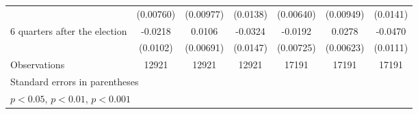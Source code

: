 \begin{table}[!ht]
\begin{tabular}{l*{6}{c}}
                    &   (0.00760)         &   (0.00977)         &    (0.0138)         &   (0.00640)         &   (0.00949)         &    (0.0141)         \\
[1em]
 6 quarters after the election&     -0.0218\sym{*}  &      0.0106         &     -0.0324\sym{*}  &     -0.0192\sym{**} &      0.0278\sym{***}&     -0.0470\sym{***}\\
                    &    (0.0102)         &   (0.00691)         &    (0.0147)         &   (0.00725)         &   (0.00623)         &    (0.0111)         \\
\hline
Observations        &       12921         &       12921         &       12921         &       17191         &       17191         &       17191         \\
\hline\hline
\multicolumn{7}{l}{\footnotesize Standard errors in parentheses}\\
\multicolumn{7}{l}{\footnotesize \sym{*} \(p<0.05\), \sym{**} \(p<0.01\), \sym{***} \(p<0.001\)}\\
\end{tabular}
\end{table}
